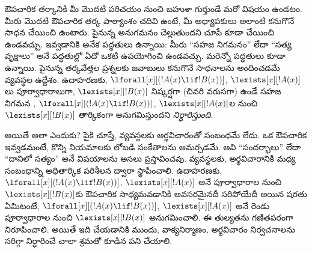 \documentclass[../../../include/open-logic-section]{subfiles}
\begin{document}
ఔపచారిక తర్కానికి మీ మొదటి పరిచయం నుంచి బహుశా గుర్తుండే మరో విషయం
\emph{} ఉండటం. మీరు మొదటి ఔపచారిక తర్క పాఠ్యాంశం
చదివి ఉంటే, మీ అధ్యాపకులు అలాంటి  కనుగొనే సాధన
చేయించి ఉంటారు. పైనున్న అనుగమనం చెల్లుతుందని చూపే
 కూడా చేయించి ఉండవచ్చు.  ఇవ్వడానికి
అనేక పద్ధతులు ఉన్నాయి: మీరు ``సహజ నిగమనం'' లేదా ``సత్య వృక్షాలు''
అనే పద్ధతుల్లో ఏదో ఒకటి ఉపయోగించి ఉండవచ్చు. మరెన్నో పద్ధతులు కూడా
ఉన్నాయి. పైనున్న తర్కవేత్తల ప్రశ్నలకు జవాబులు కనుగొనే సాధనాలను
అందించడమే  వ్యవస్థల ఉద్దేశం. ఉదాహరణకు,
$\lforall[x][(!A(x) \lif !B(x))]$, $\lexists[x][!A(x)]$లు
పూర్వాధారాలుగా, $\lexists[x][!B(x)]$ నిష్కర్షగా (చివరి వరుసగా) ఉండే
సహజ నిగమన , $\lforall[x][(!A(x) \lif !B(x))]$,
$\lexists[x][!A(x)]$ల నుంచి $\lexists[x][!B(x)]$ తార్కికంగా
అనుగమిస్తుందని \emph{నిర్ధారిస్తుంది}.

అయితే అలా ఎందుకు? పైకి చూస్తే,  వ్యవస్థలకు
అర్థవిచారంతో సంబంధమే లేదు. ఒక ఔపచారిక  ఇవ్వడమంటే,
కొన్ని నియమాలకు లోబడి సంకేతాలను అమర్చడమే. అవి ``సందర్భాలు'' లేదా
``దానిలో సత్యం'' అనే విషయాలను అసలు ప్రస్తావించవు. 
వ్యవస్థలకు, అర్థవిచారానికి మధ్య సంబంధాన్ని అధితార్కిక పరిశీలన ద్వారా
స్థాపించాలి. ఉదాహరణకు, $\lforall[x][(!A(x) \lif !B(x))]$,
$\lexists[x][!A(x)]$ అనే పూర్వాధారాల నుంచి $\lexists[x][!B(x)]$కు
  ఔపచారిక  సాధ్యమవడానికి అవసరమైనదీ సరిపోయేదీ అయిన షరతు ఏమిటంటే,
  $\lforall[x][(!A(x) \lif !B(x))]$, $\lexists[x][!A(x)]$ అనే రెండు పూర్వాధారాల నుంచి $\lexists[x][!B(x)]$ అనుగమించాలి. ఈ తుల్యతను గణితపరంగా నిరూపించాలి. అయితే ఇది చేయడానికి ముందు, వాక్యనిర్మాణం,
అర్థవిచారం నిర్వచనాలను సరిగ్గా నిర్ధారించే చాలా శ్రమతో కూడిన పని
చేయాలి.
\end{document}
